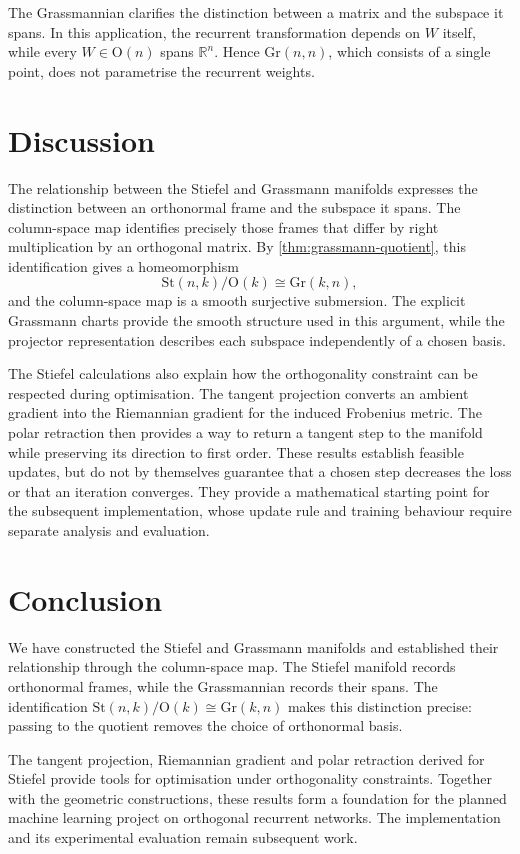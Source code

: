 \documentclass[12pt]{article}
\theoremstyle{definition}
\theoremstyle{plain}
\theoremstyle{remark}
\newcommand{\R}{\mathbb{R}}
\newcommand{\St}{\mathrm{St} (n,k)}
\newcommand{\Gr}{\mathrm{Gr} (k,n)}
\newcommand{\Orth}{\mathrm{O}}               %
\begin{document}
The Grassmannian clarifies the distinction between a matrix and the subspace it spans.
In this application, the recurrent transformation depends on \( W \) itself, while every \( W\in\Orth(n) \) spans \( \R^n \).
Hence \( \mathrm{Gr}(n,n) \), which consists of a single point, does not parametrise the recurrent weights.

\section{Discussion}\label{sec:discussion}

The relationship between the Stiefel and Grassmann manifolds expresses the distinction between an orthonormal frame and the subspace it spans.
The column-space map identifies precisely those frames that differ by right multiplication by an orthogonal matrix.
By \cref{thm:grassmann-quotient}, this identification gives a homeomorphism
\[
  \St/\Orth(k)\cong\Gr,
\]
and the column-space map is a smooth surjective submersion.
The explicit Grassmann charts provide the smooth structure used in this argument, while the projector representation describes each subspace independently of a chosen basis.

The Stiefel calculations also explain how the orthogonality constraint can be respected during optimisation.
The tangent projection converts an ambient gradient into the Riemannian gradient for the induced Frobenius metric.
The polar retraction then provides a way to return a tangent step to the manifold while preserving its direction to first order.
These results establish feasible updates, but do not by themselves guarantee that a chosen step decreases the loss or that an iteration converges.
They provide a mathematical starting point for the subsequent implementation, whose update rule and training behaviour require separate analysis and evaluation.

\section{Conclusion}\label{sec:conclusion}

We have constructed the Stiefel and Grassmann manifolds and established their relationship through the column-space map.
The Stiefel manifold records orthonormal frames, while the Grassmannian records their spans.
The identification \( \St/\Orth(k)\cong\Gr \) makes this distinction precise: passing to the quotient removes the choice of orthonormal basis.

The tangent projection, Riemannian gradient and polar retraction derived for Stiefel provide tools for optimisation under orthogonality constraints.
Together with the geometric constructions, these results form a foundation for the planned machine learning project on orthogonal recurrent networks.
The implementation and its experimental evaluation remain subsequent work.



\end{document}
